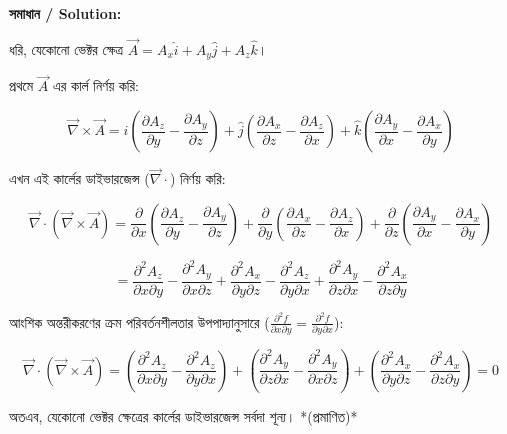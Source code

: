 \documentclass[11pt, a4paper]{article}
\begin{document}
\vspace{0.8em}
\textbf{সমাধান / Solution:}

ধরি, যেকোনো ভেক্টর ক্ষেত্র $\vec{A} = A_x\hat{i} + A_y\hat{j} + A_z\hat{k}$।

প্রথমে $\vec{A}$ এর কার্ল নির্ণয় করি:

$$\vec{\nabla} \times \vec{A} = \hat{i}\left(\frac{\partial A_z}{\partial y} - \frac{\partial A_y}{\partial z}\right) + \hat{j}\left(\frac{\partial A_x}{\partial z} - \frac{\partial A_z}{\partial x}\right) + \hat{k}\left(\frac{\partial A_y}{\partial x} - \frac{\partial A_x}{\partial y}\right)$$

এখন এই কার্লের ডাইভারজেন্স ($\vec{\nabla} \cdot$) নির্ণয় করি:

$$\vec{\nabla} \cdot (\vec{\nabla} \times \vec{A}) = \frac{\partial}{\partial x}\left(\frac{\partial A_z}{\partial y} - \frac{\partial A_y}{\partial z}\right) + \frac{\partial}{\partial y}\left(\frac{\partial A_x}{\partial z} - \frac{\partial A_z}{\partial x}\right) + \frac{\partial}{\partial z}\left(\frac{\partial A_y}{\partial x} - \frac{\partial A_x}{\partial y}\right)$$

$$= \frac{\partial^2 A_z}{\partial x \partial y} - \frac{\partial^2 A_y}{\partial x \partial z} + \frac{\partial^2 A_x}{\partial y \partial z} - \frac{\partial^2 A_z}{\partial y \partial x} + \frac{\partial^2 A_y}{\partial z \partial x} - \frac{\partial^2 A_x}{\partial z \partial y}$$

আংশিক অন্তরীকরণের ক্রম পরিবর্তনশীলতার উপপাদ্যানুসারে ($\frac{\partial^2 f}{\partial x \partial y} = \frac{\partial^2 f}{\partial y \partial x}$):

$$\vec{\nabla} \cdot (\vec{\nabla} \times \vec{A}) = \left(\frac{\partial^2 A_z}{\partial x \partial y} - \frac{\partial^2 A_z}{\partial y \partial x}\right) + \left(\frac{\partial^2 A_y}{\partial z \partial x} - \frac{\partial^2 A_y}{\partial x \partial z}\right) + \left(\frac{\partial^2 A_x}{\partial y \partial z} - \frac{\partial^2 A_x}{\partial z \partial y}\right) = 0$$

অতএব, যেকোনো ভেক্টর ক্ষেত্রের কার্লের ডাইভারজেন্স সর্বদা শূন্য। *(প্রমাণিত)*

\vspace{1em}
\begin{center}
\end{center}
\end{document}
